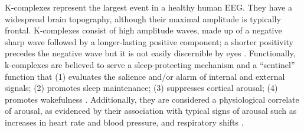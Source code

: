 K-complexes represent the largest event in a healthy human EEG. They have a widespread brain topography, although their maximal amplitude is typically frontal. K-complexes consist of high amplitude waves, made up of a negative sharp wave followed by a longer-lasting positive component; a shorter positivity precedes the negative wave but it is not easily discernible by eyes \parencite{colrain_k-complex_2005,ioannides_emergence_2019}. Functionally, k-complexes are believed to serve a sleep-protecting mechanism and a “sentinel” function that (1) evaluates the salience and/or alarm of internal and external signals; (2) promotes sleep maintenance; (3) suppresses cortical arousal; (4) promotes wakefulness \parencite{ioannides_emergence_2019,jahnke_wake_2012}. Additionally, they are considered a physiological correlate of arousal, as evidenced by their association with typical signs of arousal such as increases in heart rate and blood pressure, and respiratory shifts \parencite{forget_role_2011}.

